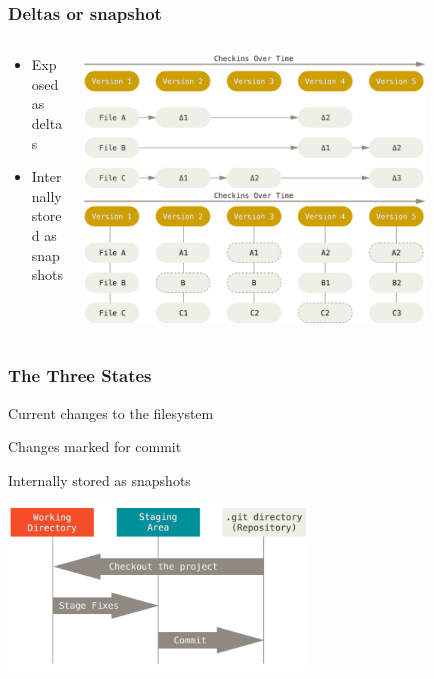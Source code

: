 \documentclass[hyperref={pdfpagelabels=false}]{beamer}
\begin{document}
\begin{frame}
\frametitle{Deltas or snapshot}
\begin{columns}
\begin{column}{0.3\textwidth}
	\begin{itemize}
		\item Exposed as deltas
		\vspace{0.1\textheight}
		\item Internally stored as snapshots
	\end{itemize}
\end{column}
\begin{column}{0.7\textwidth}  %
	\begin{center}
    \includegraphics[width=0.8\textwidth]{deltas}
    \vspace{2em}
    \includegraphics[width=0.8\textwidth]{snapshots}
    \end{center}
\end{column}
\end{columns}
\end{frame}

\begin{frame}
\frametitle{The Three States}
	\begin{description}
		\item [Working directory] Current changes to the filesystem
		\item [Staging area]Changes marked for commit
		\item [Commited] Internally stored as snapshots
	\end{description}
    \begin{center}
    \includegraphics[width=0.6\textwidth]{areas}
    \end{center}
\end{frame}
\end{document}
